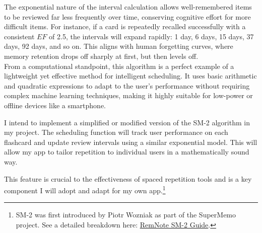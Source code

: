 \documentclass[a4paper,12pt]{article}
\begin{document}
The exponential nature of the interval calculation allows well-remembered items to be reviewed far less frequently over time, conserving cognitive effort for more difficult items. For instance, if a card is repeatedly recalled successfully with a consistent $EF$ of 2.5, the intervals will expand rapidly: 1 day, 6 days, 15 days, 37 days, 92 days, and so on. This aligns with human forgetting curves, where memory retention drops off sharply at first, but then levels off. \\

From a computational standpoint, this algorithm is a perfect example of a lightweight yet effective method for intelligent scheduling. It uses basic arithmetic and quadratic expressions to adapt to the user's performance without requiring complex machine learning techniques, making it highly suitable for low-power or offline devices like a smartphone. \\

\medskip

I intend to implement a simplified or modified version of the SM-2 algorithm in my project. The scheduling function will track user performance on each flashcard and update review intervals using a similar exponential model. This will allow my app to tailor repetition to individual users in a mathematically sound way. \\

\medskip

\noindent This feature is crucial to the effectiveness of spaced repetition tools and is a key component I will adopt and adapt for my own app.\footnote{SM-2 was first introduced by Piotr Wozniak as part of the SuperMemo project. See a detailed breakdown here: \href{https://help.remnote.com/en/articles/6026144-the-anki-sm-2-spaced-repetition-algorithm}{RemNote SM-2 Guide}.}

\newpage
\end{document}

